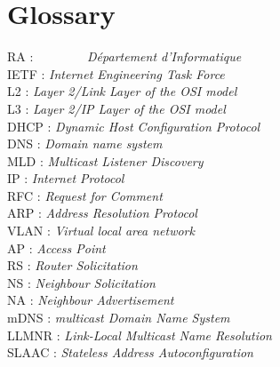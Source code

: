 \documentclass[a4paper,11pt]{article}
\begin{document}
	\section{Glossary}
			\begin{tabbing}
	  		RA : ~~~~~~~~\= \textit{Département d'Informatique} \\
	 	 	IETF : \> \textit{Internet Engineering Task Force} \\
	  		L2 : \> \textit{Layer 2/Link Layer of the OSI model} \\
	  		L3 : \> \textit{Layer 2/IP Layer of the OSI model} \\
	 		DHCP : \> \textit{Dynamic Host Configuration Protocol} \\
	  		DNS : \> \textit{Domain name system} \\
	  		MLD : \> \textit{Multicast Listener Discovery} \\
	  		IP : \> \textit{Internet Protocol} \\
	  		RFC : \> \textit{Request for Comment} \\
	  		ARP : \> \textit{Address Resolution Protocol} \\
	  		VLAN : \> \textit{Virtual local area network} \\
	  		AP : \> \textit{Access Point} \\
	  		RS : \> \textit{Router Solicitation} \\
	  		NS : \> \textit{Neighbour Solicitation} \\
	  		NA : \> \textit{Neighbour Advertisement} \\
	  		mDNS : \> \textit{ multicast Domain Name System} \\
	  		LLMNR : \> \textit{ Link-Local Multicast Name Resolution} \\
	  		SLAAC : \> \textit{ Stateless Address Autoconfiguration} \\
			\end{tabbing}
				
				
				
\end{document}
